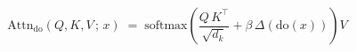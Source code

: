 \begin{equation}
\mathrm{Attn}_{\mathrm{do}}(Q, K, V \,;\, x) \; = \; \mathrm{softmax}\!\left( \frac{Q \, K^{\top}}{\sqrt{d_k}} + \beta \, \Delta(\mathrm{do}(x)) \right) V
\end{equation}
